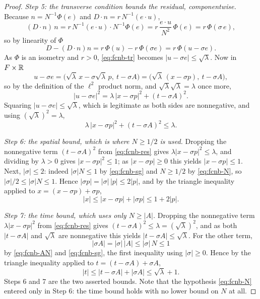 \begin{proof}
\emph{Step 5: the transverse condition bounds the residual, componentwise.}
Because $n=N^{-1}\Phi(e)$ and $D\cdot n=r\,N^{-1}(e\cdot u)$,
\[
  (D\cdot n)\,n=r\,N^{-1}(e\cdot u)\cdot N^{-1}\Phi(e)
    =r\,\frac{e\cdot u}{N^2}\,\Phi(e)=r\,\Phi(\sigma\,e),
\]
so by linearity of $\Phi$
\[
  D-(D\cdot n)n=r\,\Phi(u)-r\,\Phi(\sigma e)=r\,\Phi(u-\sigma e).
\]
As $\Phi$ is an isometry and $r>0$, \eqref{eq:fcnb-tr} becomes
$|u-\sigma e|\le\sqrt\lambda$. Now in $F\times\mathbb{R}$
\[
  u-\sigma e
   =\bigl(\sqrt\lambda\,x-\sigma\sqrt\lambda\,p,\ t-\sigma A\bigr)
   =\bigl(\sqrt\lambda\,(x-\sigma p),\ t-\sigma A\bigr),
\]
so by the definition of the $\ell^2$ product norm, and
$\sqrt\lambda\sqrt\lambda=\lambda$ once more,
\[
  |u-\sigma e|^2=\lambda\,|x-\sigma p|^2+(t-\sigma A)^2 .
\]
Squaring $|u-\sigma e|\le\sqrt\lambda$, which is legitimate as both sides are
nonnegative, and using $(\sqrt\lambda)^2=\lambda$,
\begin{equation}\label{eq:fcnb-res}
  \lambda\,|x-\sigma p|^2+(t-\sigma A)^2\le\lambda .
\end{equation}

\emph{Step 6: the spatial bound, which is where $N\ge1/2$ is used.}
Dropping the nonnegative term $(t-\sigma A)^2$ from \eqref{eq:fcnb-res} gives
$\lambda|x-\sigma p|^2\le\lambda$, and dividing by $\lambda>0$ gives
$|x-\sigma p|^2\le1$; as $|x-\sigma p|\ge0$ this yields
$|x-\sigma p|\le1$. Next, $|\sigma|\le2$: indeed $|\sigma|N\le1$ by
\eqref{eq:fcnb-sg} and $N\ge1/2$ by \eqref{eq:fcnb-N}, so
$|\sigma|/2\le|\sigma|N\le1$. Hence $|\sigma p|=|\sigma|\,|p|\le2|p|$, and by
the triangle inequality applied to $x=(x-\sigma p)+\sigma p$,
\[
  |x|\le|x-\sigma p|+|\sigma p|\le1+2|p| .
\]

\emph{Step 7: the time bound, which uses only $N\ge|A|$.}
Dropping the nonnegative term $\lambda|x-\sigma p|^2$ from
\eqref{eq:fcnb-res} gives $(t-\sigma A)^2\le\lambda=(\sqrt\lambda)^2$, and as
both $|t-\sigma A|$ and $\sqrt\lambda$ are nonnegative this yields
$|t-\sigma A|\le\sqrt\lambda$. For the other term,
\[
  |\sigma A|=|\sigma|\,|A|\le|\sigma|\,N\le1
\]
by \eqref{eq:fcnb-AN} and \eqref{eq:fcnb-sg}, the first inequality using
$|\sigma|\ge0$. Hence by the triangle inequality applied to
$t=(t-\sigma A)+\sigma A$,
\[
  |t|\le|t-\sigma A|+|\sigma A|\le\sqrt\lambda+1 .
\]
Steps 6 and 7 are the two asserted bounds. Note that the hypothesis
\eqref{eq:fcnb-N} entered only in Step 6: the time bound holds with no lower
bound on $N$ at all.
\end{proof}
